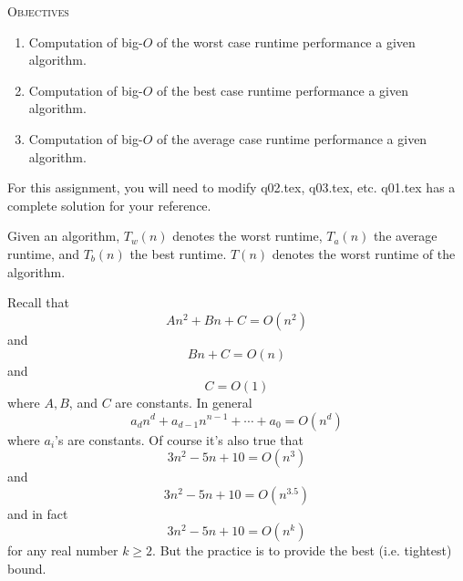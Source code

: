 \textsc{Objectives}
\begin{enumerate}[nosep]
\item Computation of big-$O$ of the worst case runtime performance
a given algorithm.
\item Computation of big-$O$ of the best case runtime performance
a given algorithm.
\item Computation of big-$O$ of the average case runtime performance
a given algorithm.
\end{enumerate}
\mbox{}


For this assignment, you will need to modify q02.tex, q03.tex, etc.
q01.tex has a complete solution for your reference.



Given an algorithm, 
$T_w(n)$ denotes the worst runtime, 
$T_a(n)$ the average runtime, and
$T_b(n)$ the best runtime.
$T(n)$ denotes the worst runtime
of the algorithm.

Recall that 
\[
An^2 + Bn + C = O(n^2)
\]
and
\[
Bn + C = O(n)
\]
and
\[
C = O(1)
\]
where $A, B$, and $C$ are constants.
In general
\[
a_dn^d + a_{d-1} n^{n-1} + \cdots + a_0 = O(n^d)
\]
where $a_i$'s are constants.
Of course it's also true that
\[
3n^2 - 5n + 10 = O(n^3)
\]
and
\[
3n^2 - 5n + 10 = O(n^{3.5})
\]
and in fact
\[
3n^2 - 5n + 10 = O(n^{k})
\]
for any real number $k \geq 2$.
But the practice is to provide the best (i.e. tightest) bound.

